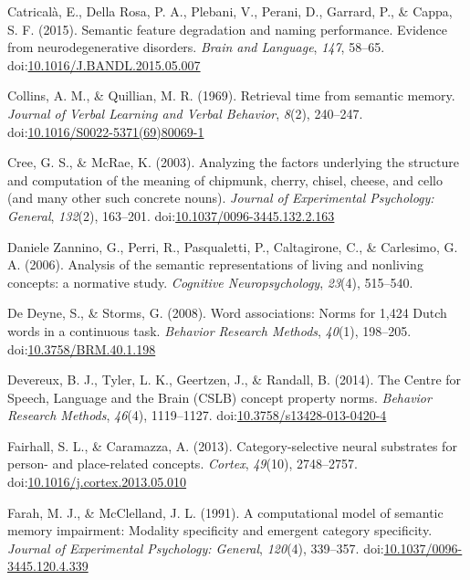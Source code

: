 \documentclass[man]{apa6}
\begin{document}
\leavevmode\hypertarget{ref-Catricala2015}{}%
Catricalà, E., Della Rosa, P. A., Plebani, V., Perani, D., Garrard, P., \& Cappa, S. F. (2015). Semantic feature degradation and naming performance. Evidence from neurodegenerative disorders. \emph{Brain and Language}, \emph{147}, 58--65. doi:\href{https://doi.org/10.1016/J.BANDL.2015.05.007}{10.1016/J.BANDL.2015.05.007}

\leavevmode\hypertarget{ref-Collins1969}{}%
Collins, A. M., \& Quillian, M. R. (1969). Retrieval time from semantic memory. \emph{Journal of Verbal Learning and Verbal Behavior}, \emph{8}(2), 240--247. doi:\href{https://doi.org/10.1016/S0022-5371(69)80069-1}{10.1016/S0022-5371(69)80069-1}

\leavevmode\hypertarget{ref-Cree2003}{}%
Cree, G. S., \& McRae, K. (2003). Analyzing the factors underlying the structure and computation of the meaning of chipmunk, cherry, chisel, cheese, and cello (and many other such concrete nouns). \emph{Journal of Experimental Psychology: General}, \emph{132}(2), 163--201. doi:\href{https://doi.org/10.1037/0096-3445.132.2.163}{10.1037/0096-3445.132.2.163}

\leavevmode\hypertarget{ref-DanieleZannino2006}{}%
Daniele Zannino, G., Perri, R., Pasqualetti, P., Caltagirone, C., \& Carlesimo, G. A. (2006). Analysis of the semantic representations of living and nonliving concepts: a normative study. \emph{Cognitive Neuropsychology}, \emph{23}(4), 515--540.

\leavevmode\hypertarget{ref-DeDeyne2008c}{}%
De Deyne, S., \& Storms, G. (2008). Word associations: Norms for 1,424 Dutch words in a continuous task. \emph{Behavior Research Methods}, \emph{40}(1), 198--205. doi:\href{https://doi.org/10.3758/BRM.40.1.198}{10.3758/BRM.40.1.198}

\leavevmode\hypertarget{ref-Devereux2014}{}%
Devereux, B. J., Tyler, L. K., Geertzen, J., \& Randall, B. (2014). The Centre for Speech, Language and the Brain (CSLB) concept property norms. \emph{Behavior Research Methods}, \emph{46}(4), 1119--1127. doi:\href{https://doi.org/10.3758/s13428-013-0420-4}{10.3758/s13428-013-0420-4}

\leavevmode\hypertarget{ref-Fairhall2013}{}%
Fairhall, S. L., \& Caramazza, A. (2013). Category-selective neural substrates for person- and place-related concepts. \emph{Cortex}, \emph{49}(10), 2748--2757. doi:\href{https://doi.org/10.1016/j.cortex.2013.05.010}{10.1016/j.cortex.2013.05.010}

\leavevmode\hypertarget{ref-Farah1991}{}%
Farah, M. J., \& McClelland, J. L. (1991). A computational model of semantic memory impairment: Modality specificity and emergent category specificity. \emph{Journal of Experimental Psychology: General}, \emph{120}(4), 339--357. doi:\href{https://doi.org/10.1037/0096-3445.120.4.339}{10.1037/0096-3445.120.4.339}
\end{document}
